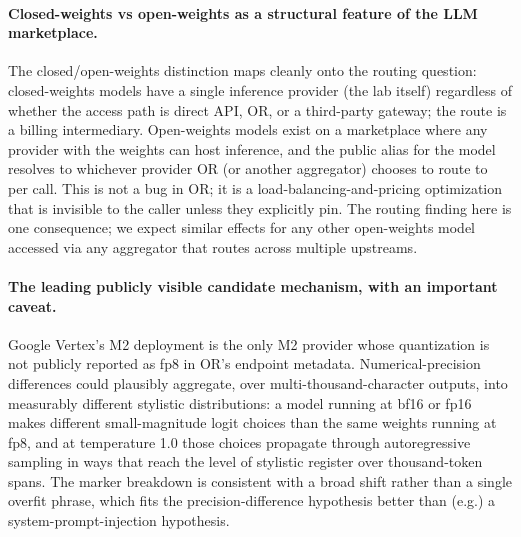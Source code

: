 \documentclass[11pt,a4paper]{article}
\begin{document}
\paragraph{Closed-weights vs open-weights as a structural feature of the LLM marketplace.} The closed/open-weights distinction maps cleanly onto the routing question: closed-weights models have a single inference provider (the lab itself) regardless of whether the access path is direct API, OR, or a third-party gateway; the route is a billing intermediary. Open-weights models exist on a marketplace where any provider with the weights can host inference, and the public alias for the model resolves to whichever provider OR (or another aggregator) chooses to route to per call. This is not a bug in OR; it is a load-balancing-and-pricing optimization that is invisible to the caller unless they explicitly pin. The routing finding here is one consequence; we expect similar effects for any other open-weights model accessed via any aggregator that routes across multiple upstreams.

\paragraph{The leading publicly visible candidate mechanism, with an important caveat.} Google Vertex's M2 deployment is the only M2 provider whose quantization is not publicly reported as fp8 in OR's endpoint metadata. Numerical-precision differences could plausibly aggregate, over multi-thousand-character outputs, into measurably different stylistic distributions: a model running at bf16 or fp16 makes different small-magnitude logit choices than the same weights running at fp8, and at temperature 1.0 those choices propagate through autoregressive sampling in ways that reach the level of stylistic register over thousand-token spans. The marker breakdown is consistent with a broad shift rather than a single overfit phrase, which fits the precision-difference hypothesis better than (e.g.) a system-prompt-injection hypothesis.
\end{document}
